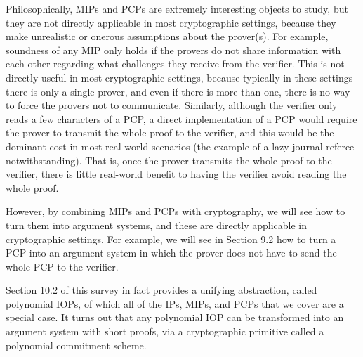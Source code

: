 Philosophically, MIPs and PCPs are extremely interesting objects to study, but they are not directly applicable in most cryptographic settings, because they make unrealistic or onerous assumptions about the prover(s). For example, soundness of any MIP only holds if the provers do not share information with each other regarding what challenges they receive from the verifier. This is not directly useful in most cryptographic settings, because typically in these settings there is only a single prover, and even if there is more than one, there is no way to force the provers not to communicate. Similarly, although the verifier only reads a few characters of a PCP, a direct implementation of a PCP would require the prover to transmit the whole proof to the verifier, and this would be the dominant cost in most real-world scenarios (the example of a lazy journal referee notwithstanding). That is, once the prover transmits the whole proof to the verifier, there is little real-world benefit to having the verifier avoid reading the whole proof.

However, by combining MIPs and PCPs with cryptography, we will see how to turn them into argument systems, and these are directly applicable in cryptographic settings. For example, we will see in Section 9.2 how to turn a PCP into an argument system in which the prover does not have to send the whole PCP to the verifier.

Section 10.2 of this survey in fact provides a unifying abstraction, called polynomial IOPs, of which all of the IPs, MIPs, and PCPs that we cover are a special case. It turns out that any polynomial IOP can be transformed into an argument system with short proofs, via a cryptographic primitive called a polynomial commitment scheme.
